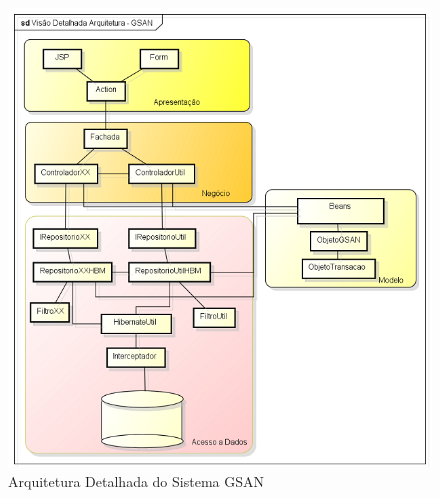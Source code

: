 \begin{figure}[H]
	\centering
	\caption{Arquitetura Detalhada do Sistema GSAN}	
	\label{figura:arquiteturaDetalhada}
	\includegraphics{figuras/gsanArquitetura.png}
\end{figure}

